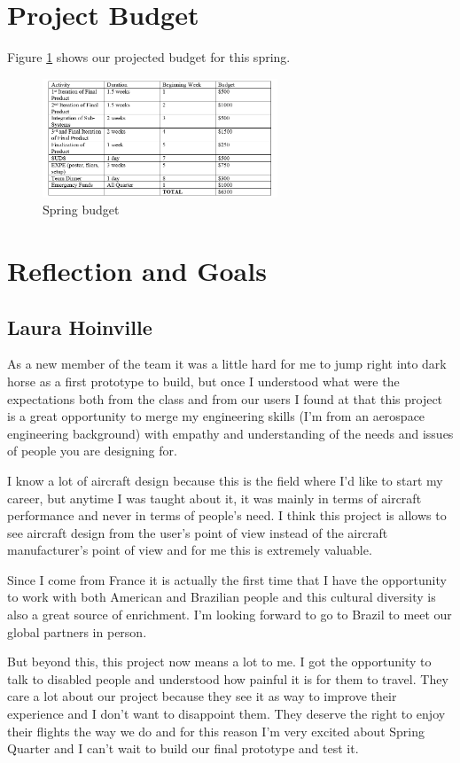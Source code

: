 \section{Project Budget}
Figure \ref{fig:budget} shows our projected budget for this spring.

\begin{figure}[h]
\centering
\includegraphics[width=7cm]{images/budget.png}
\caption{Spring budget}
\label{fig:budget}
\end{figure}


\section{Reflection and Goals}

\subsection{Laura Hoinville}
As a new member of the team it was a little hard for me to jump right into dark horse as a first prototype to build, but once I understood what were the expectations both from the class and from our users I found at that this project is a great opportunity to merge my engineering skills (I’m from an aerospace engineering background) with empathy and understanding of the needs and issues of people you are designing for. 

I know a lot of aircraft design because this is the field where I’d like to start my career, but anytime I was taught about it, it was mainly in terms of aircraft performance and never in terms of people’s need. I think this project is allows to see aircraft design from the user’s point of view instead of the aircraft manufacturer’s point of view and for me this is extremely valuable. 

Since I come from France it is actually the first time that I have the opportunity to work with both American and Brazilian people and this cultural diversity is also a great source of enrichment. I’m looking forward to go to Brazil to meet our global partners in person. 

But beyond this, this project now means a lot to me. I got the opportunity to talk to disabled people and understood how painful it is for them to travel. They care a lot about our project because they see it as way to improve their experience and I don’t want to disappoint them. They deserve the right to enjoy their flights the way we do and for this reason I’m very excited about Spring Quarter and I can’t wait to build our final prototype and test it.

